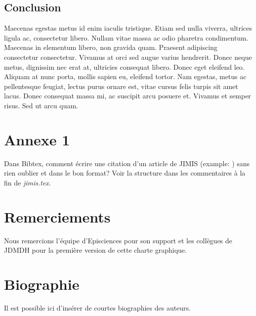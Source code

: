 \documentclass[jimisdraft]{jimis-fr}
\begin{document}
\subsection{Conclusion}
Maecenas egestas metus id enim iaculis tristique. Etiam sed nulla viverra, ultrices ligula ac, consectetur libero. Nullam vitae massa ac odio pharetra condimentum. Maecenas in elementum libero, non gravida quam. Praesent adipiscing consectetur consectetur. Vivamus at orci sed augue varius hendrerit. Donec neque metus, dignissim nec erat at, ultricies consequat libero. Donec eget eleifend leo. Aliquam at nunc porta, mollis sapien eu, eleifend tortor. Nam egestas, metus ac pellentesque feugiat, lectus purus ornare est, vitae cursus felis turpis sit amet lacus. Donec consequat massa mi, ac suscipit arcu posuere et. Vivamus et semper risus. Sed ut arcu quam.

















\appendix\footnotesize
\section{Annexe 1}
Dans Bibtex, comment écrire une citation d'un article de JIMIS (example: \citet{jimis}) sans rien oublier et dans le bon format?
Voir la structure dans les commentaires à la fin de \textit{jimis.tex}.





\section{Remerciements}
Nous remercions l'équipe d'Episciences pour son support et les collègues de JDMDH pour la première version de cette charte graphique.





\section{Biographie}
Il est possible ici d'insérer de courtes biographies des auteurs.
\end{document}
